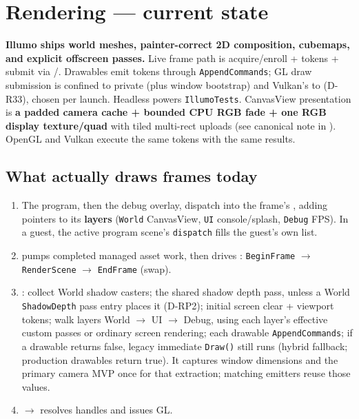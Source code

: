\section{Rendering --- current state}
\label{sec:rendering-current}

\begin{statusbox}
\textbf{Illumo ships world meshes, painter-correct 2D composition, cubemaps,
and explicit offscreen passes.} Live
frame path is acquire/enroll + tokens + submit via
/.
Drawables emit tokens through \texttt{AppendCommands}; GL draw submission is
confined to private  (plus window
bootstrap) and Vulkan's to  (D-R33),
chosen per launch. Headless 
powers \texttt{IllumoTests}. CanvasView
presentation is \textbf{a padded camera cache + bounded CPU RGB fade + one RGB
display texture/quad} with tiled multi-rect uploads (see canonical note in
).
OpenGL and Vulkan execute the same tokens with the same results.
\end{statusbox}

\subsection{What actually draws frames today}
\begin{enumerate}
  \item The program, then the debug overlay, dispatch into the frame's
        , adding  pointers to its
        \textbf{layers} (\texttt{World} CanvasView, \texttt{UI} console/splash,
        \texttt{Debug} FPS). In a guest, the active program scene's
        \texttt{dispatch} fills the guest's own list.
  \item {} pumps completed managed asset work, then
        drives :
        \texttt{BeginFrame} $\rightarrow$ \texttt{RenderScene} $\rightarrow$
        \texttt{EndFrame} (swap).
  \item {}:
        collect World shadow casters; the shared shadow depth pass, unless a
        World \texttt{ShadowDepth} pass entry places it (D-RP2);
        initial screen clear + viewport tokens; walk layers
        World $\rightarrow$ UI $\rightarrow$ Debug, using each layer's effective
        custom passes or ordinary screen rendering; each drawable
        \texttt{AppendCommands}; if a drawable returns false, legacy immediate
        \texttt{Draw()} still runs (hybrid fallback; production drawables return true).
        It captures window dimensions and the primary camera MVP once for that
        extraction; matching  emitters reuse those values.
  \item {} $\rightarrow$
         resolves handles and issues GL.
\end{enumerate}

